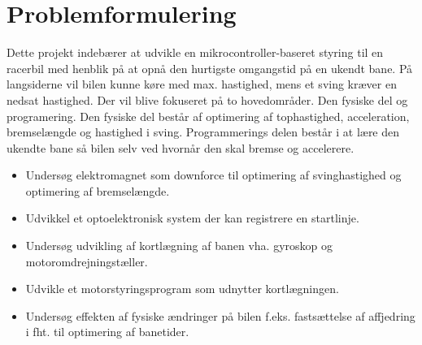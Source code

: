 
\section{Problemformulering}
Dette projekt indebærer at udvikle en mikrocontroller-baseret styring til en racerbil med henblik på at opnå den hurtigste omgangstid på en ukendt bane.
På langsiderne vil bilen kunne køre med max. hastighed, mens et sving kræver en nedsat hastighed.
Der vil blive fokuseret på to hovedområder. Den fysiske del og programering. Den fysiske del består af optimering af tophastighed, acceleration, bremselængde og hastighed i sving.
Programmerings delen består i at lære den ukendte bane så bilen selv ved hvornår den skal bremse og accelerere.
\begin{itemize}
\item Undersøg elektromagnet som downforce til optimering af svinghastighed og optimering af bremselængde.
\item Udvikkel et optoelektronisk system der kan registrere en startlinje.
\item Undersøg udvikling af kortlægning af banen vha. gyroskop og motoromdrejningstæller.
\item Udvikle et motorstyringsprogram som udnytter kortlægningen.
\item Undersøg effekten af fysiske ændringer på bilen f.eks. fastsættelse af affjedring i fht. til optimering af banetider.
\end{itemize}

